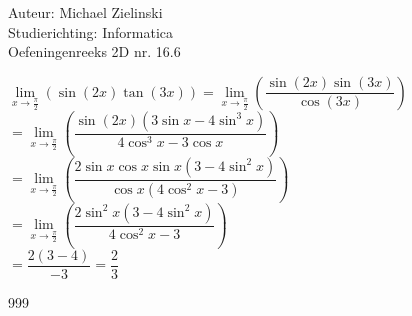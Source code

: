 \documentclass[a4paper]{article}
\begin{document}
\noindent \large Auteur: Michael Zielinski\\
\noindent \large Studierichting: Informatica\\
\noindent \large Oefeningenreeks 2D nr. 16.6\\

\medskip

\normalsize

$ \lim\limits_{x \rightarrow \tfrac{\pi}{2}} \left(\sin(2x)\tan(3x)\right)
= \lim\limits_{x \rightarrow \tfrac{\pi}{2}} \left(\dfrac{\sin(2x)\sin(3x)}{\cos(3x)}\right) $\\

$ = \lim\limits_{x \rightarrow \tfrac{\pi}{2}} \left(\dfrac{\sin(2x)\left(3\sin x - 4\sin^3x\right)}{4\cos^3x - 3\cos x}\right) $\\

$ = \lim\limits_{x \rightarrow \tfrac{\pi}{2}} \left(\dfrac{2\sin x\cos x\sin x\left(3-4\sin^2x\right)}{\cos x\left(4\cos^2x-3\right)}\right) $\\

$ = \lim\limits_{x \rightarrow \tfrac{\pi}{2}} \left(\dfrac{2\sin^2x\left(3-4\sin^2x\right)}{4\cos^2x-3}\right) $\\

$ = \dfrac{2\left(3-4\right)}{-3} = \dfrac{2}{3} $\\

\begin{thebibliography}{999}
\end{thebibliography}
\end{document}
